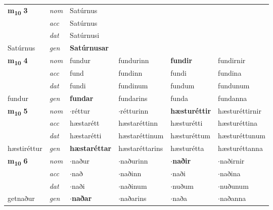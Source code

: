 \begin{longtable}[l]{llllll}
\multirow{3}{*}{{{\textbf{m{\textsubscript{10}}} \Large{\textbf{3}}}}}  & {\footnotesize{{\textit{nom}}}} & Satúrnus &     & \textbf{} &   \\*
 &  {\footnotesize{{\textit{acc}}}} & Satúrnus  &    &   &  \\*
 &  {\footnotesize{{\textit{dat}}}} & Satúrnusi &    &  &  \\*
 {\footnotesize{Satúrnus}} &   {\footnotesize{{\textit{gen}}}} & \textbf{Satúrnusar}  &   &  &  \\
\cmidrule{1-6}


\multirow{3}{*}{{{\textbf{m{\textsubscript{10}}} \Large{\textbf{4}}}}}  & {\footnotesize{{\textit{nom}}}} & fundur & fundurinn    & \textbf{fundir} & fundirnir  \\*
 &  {\footnotesize{{\textit{acc}}}} & fund  & fundinn   & fundi  & fundina \\*
 &  {\footnotesize{{\textit{dat}}}} & fundi & fundinum   & fundum & fundunum \\*
 {\footnotesize{fundur}} &   {\footnotesize{{\textit{gen}}}} & \textbf{fundar}  & fundarins  & funda & fundanna \\
\cmidrule{1-6}


\multirow{3}{*}{{{\textbf{m{\textsubscript{10}}} \Large{\textbf{5}}}}}  & {\footnotesize{{\textit{nom}}}} & $\cdot$réttur & $\cdot$rétturinn    & \textbf{hæsturéttir} & hæsturéttirnir  \\*
 &  {\footnotesize{{\textit{acc}}}} & hæstarétt  & hæstaréttinn   & hæsturétti  & hæsturéttina \\*
 &  {\footnotesize{{\textit{dat}}}} & hæstarétti & hæstaréttinum   & hæsturéttum & hæsturéttunum \\*
 {\footnotesize{hæstiréttur}} &   {\footnotesize{{\textit{gen}}}} & \textbf{hæstaréttar}  & hæstaréttarins  & hæsturétta & hæsturéttanna \\
\cmidrule{1-6}


\multirow{3}{*}{{{\textbf{m{\textsubscript{10}}} \Large{\textbf{6}}}}}  & {\footnotesize{{\textit{nom}}}} & $\cdot$naður & $\cdot$naðurinn    & \textbf{$\cdot$naðir} & $\cdot$naðirnir  \\*
 &  {\footnotesize{{\textit{acc}}}} & $\cdot$nað  & $\cdot$naðinn   & $\cdot$naði  & $\cdot$naðina \\*
 &  {\footnotesize{{\textit{dat}}}} & $\cdot$naði & $\cdot$naðinum   & $\cdot$nuðum & $\cdot$nuðunum \\*
 {\footnotesize{getnaður}} &   {\footnotesize{{\textit{gen}}}} & \textbf{$\cdot$naðar}  & $\cdot$naðarins  & $\cdot$naða & $\cdot$naðanna \\
\cmidrule{1-6}



\end{longtable}
